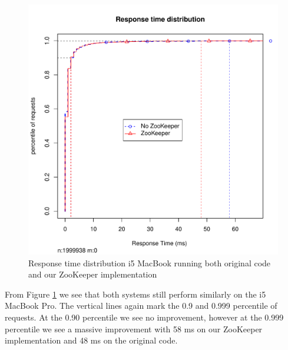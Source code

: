 \clearpage

\begin{figure}[h]
    \centering
    \includegraphics[width=1.0\textwidth]{results/distribution/distribution_knut}
    \caption{Response time distribution i5 MacBook running both original code and our ZooKeeper implementation}
    \label{fig:dist_knut}
\end{figure}

From Figure \ref{fig:dist_knut} we see that both systems still perform similarly on the i5 MacBook Pro. The vertical lines again mark the 0.9 and 0.999 percentile of requests. At the 0.90 percentile we see no improvement, however at the 0.999 percentile we see a massive improvement with 58 ms on our ZooKeeper implementation and 48 ms on the original code.  

\clearpage

